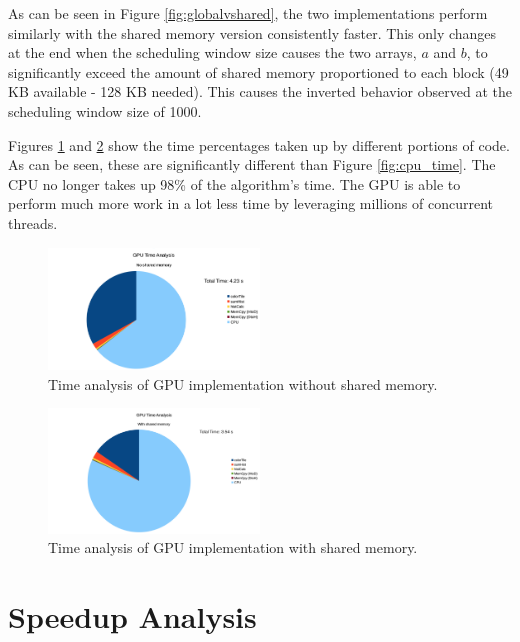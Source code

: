 \documentclass[journal]{IEEEtran}
\begin{document}
As can be seen in Figure \ref{fig:globalvshared}, the two implementations perform similarly with the shared memory version consistently faster. This only changes at the end when the scheduling window size causes the two arrays, $a$ and $b$, to significantly exceed the amount of shared memory proportioned to each block (49 KB available - 128 KB needed). This causes the inverted behavior observed at the  scheduling window size of 1000.

Figures \ref{fig:gpu_noshared_time} and \ref{fig:gpu_shared_time} show the time percentages taken up by different portions of code. As can be seen, these are significantly different than Figure \ref{fig:cpu_time}. The CPU no longer takes up 98\% of the algorithm's time. The GPU is able to perform much more work in a lot less time by leveraging millions of concurrent threads.

\begin{figure}[ht]
\centering
\includegraphics[width=0.5\textwidth]{gpu_noshared_time_analysis}
\caption{Time analysis of GPU implementation without shared memory.}
\label{fig:gpu_noshared_time}
\end{figure}

\begin{figure}[ht]
\centering
\includegraphics[width=0.5\textwidth]{gpu_shared_time_analysis}
\caption{Time analysis of GPU implementation with shared memory.}
\label{fig:gpu_shared_time}
\end{figure}


\section{Speedup Analysis}
\end{document}
